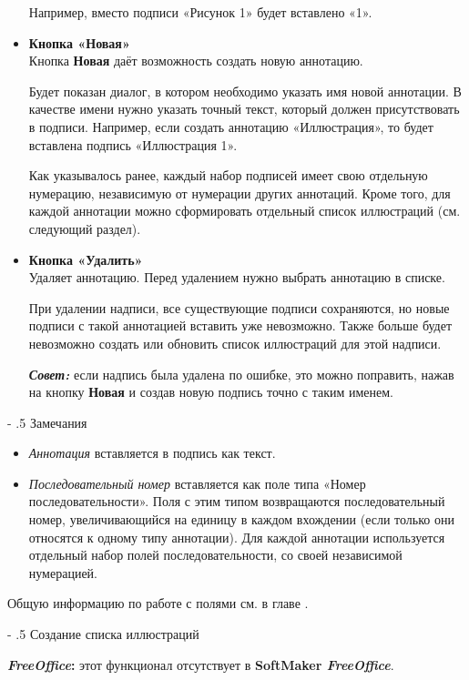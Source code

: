 ﻿\documentclass[a4paper,10pt]{article}
\makeatletter
\renewcommand\paragraph{%
   \@startsection{paragraph}{4}{0mm}%
      {-\baselineskip}%
      {.5\baselineskip}%
      {\normalfont\normalsize\bfseries}}
\makeatother
\begin{document}
\begin{itemize}
Например, вместо подписи «Рисунок 1» будет вставлено «1».
\item \textbf{Кнопка «Новая»}\\
Кнопка \textbf{Новая} даёт возможность создать новую аннотацию.

Будет показан диалог, в котором необходимо указать имя новой аннотации. В качестве имени нужно указать точный текст, который должен присутствовать в подписи. Например, если создать аннотацию «Иллюстрация», то будет вставлена подпись «Иллюстрация 1».

Как указывалось ранее, каждый набор подписей имеет свою отдельную нумерацию, независимую от нумерации других аннотаций. Кроме того, для каждой аннотации можно сформировать отдельный список иллюстраций (см. следующий раздел).
\item \textbf{Кнопка «Удалить»\\}
Удаляет аннотацию. Перед удалением нужно выбрать аннотацию в списке.

При удалении надписи, все существующие подписи сохраняются, но новые подписи с такой аннотацией вставить уже невозможно. Также больше будет невозможно создать или обновить список иллюстраций для этой надписи.

\begin{mdframed}[backgroundcolor=blue!10]
\textbf{\textit{Совет:}} если надпись была удалена по ошибке, это можно поправить, нажав на кнопку \textbf{Новая} и создав новую подпись точно с таким именем.
\end{mdframed}
\end{itemize}

\paragraph{Замечания}
\begin{itemize}
 \item \textit{Аннотация} вставляется в подпись как текст.
 \item \textit{Последовательный номер} вставляется как поле типа «Номер последовательности». Поля с этим типом возвращаются последовательный номер, увеличивающийся на единицу в каждом вхождении (если только они относятся к одному типу аннотации). Для каждой аннотации используется отдельный набор полей последовательности, со своей независимой нумерацией.
\end{itemize}

Общую информацию по работе с полями см. в главе .

\paragraph{Создание списка иллюстраций}
\begin{mdframed}[backgroundcolor=pink!50]
\textbf{\textit{FreeOffice}:} этот функционал отсутствует в \textbf{SoftMaker \textit{FreeOffice}}.
\end{mdframed}
\end{document}
